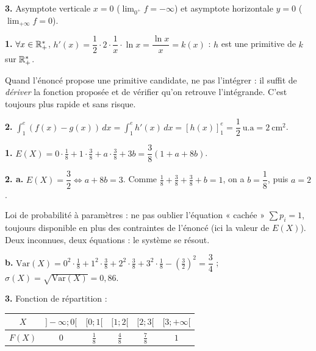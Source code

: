 \documentclass[11pt]{article}
\begin{document}
\textbf{3.} Asymptote verticale $x = 0$ ($\lim_{0^+} f = -\infty$) et asymptote horizontale $y = 0$ ($\lim_{+\infty} f = 0$).
\begin{center}
\end{center}

\textbf{1.} $\forall x \in \mathbb{R}_+^*$, $h'(x) = \dfrac{1}{2}\cdot 2\cdot\dfrac{1}{x}\cdot\ln x = \dfrac{\ln x}{x} = k(x)$ : $h$ est une primitive de $k$ sur $\mathbb{R}_+^*$.

\begin{methode}
Quand l'énoncé propose une primitive candidate, ne pas l'intégrer :
il suffit de \emph{dériver} la fonction proposée et de vérifier qu'on
retrouve l'intégrande. C'est toujours plus rapide et sans risque.
\end{methode}

\textbf{2.} $\displaystyle\int_1^e (f(x) - g(x))\,dx = \int_1^e h'(x)\,dx = [h(x)]_1^e = \dfrac{1}{2}\ \text{u.a} = 2\ \text{cm}^2$.

\textbf{1.} $E(X) = 0\cdot\tfrac{1}{8} + 1\cdot\tfrac{3}{8} + a\cdot\tfrac{3}{8} + 3b = \dfrac{3}{8}(1 + a + 8b)$.

\textbf{2. a.} $E(X) = \dfrac{3}{2} \Leftrightarrow a + 8b = 3$. Comme $\tfrac{1}{8} + \tfrac{3}{8} + \tfrac{3}{8} + b = 1$, on a $b = \dfrac{1}{8}$, puis $a = 2$.

\begin{methode}
Loi de probabilité à paramètres : ne pas oublier l'équation « cachée »
$\sum p_i = 1$, toujours disponible en plus des contraintes de l'énoncé
(ici la valeur de $E(X)$). Deux inconnues, deux équations : le système
se résout.
\end{methode}

\textbf{b.} $\mathrm{Var}(X) = 0^2\cdot\tfrac{1}{8} + 1^2\cdot\tfrac{3}{8} + 2^2\cdot\tfrac{3}{8} + 3^2\cdot\tfrac{1}{8} - \left(\tfrac{3}{2}\right)^2 = \dfrac{3}{4}$ ; $\sigma(X) = \sqrt{\mathrm{Var}(X)} = 0{,}86$.

\textbf{3.} Fonction de répartition :
\begin{center}\renewcommand{\arraystretch}{1.5}
\begin{tabular}{|c|c|c|c|c|c|}
\hline $X$ & $]-\infty;0[$ & $[0;1[$ & $[1;2[$ & $[2;3[$ & $[3;+\infty[$ \\\hline $F(X)$ & $0$ & $\frac{1}{8}$ & $\frac{4}{8}$ & $\frac{7}{8}$ & $1$ \\\hline
\end{tabular}
\end{center}
\end{document}
